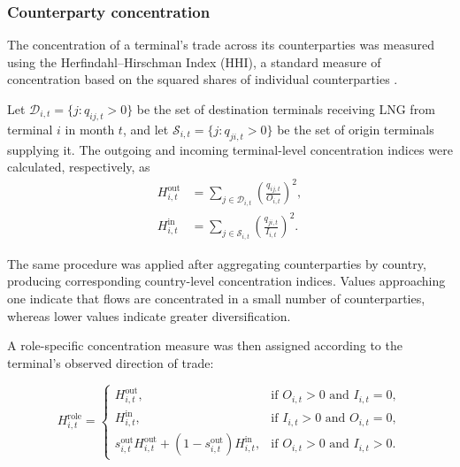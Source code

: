 \documentclass[pdftex,12pt,openright,a4paper,oneside]{book}
\begin{document}
\subsubsection{Counterparty concentration}
\label{hhi_index}
The concentration of a terminal's trade across its counterparties was measured using the Herfindahl--Hirschman Index (HHI), a standard measure of concentration based on the squared shares of individual counterparties \citep{hirschman1945}. 

Let \(\mathcal{D}_{i,t}=\{j:q_{ij,t}>0\}\) be the set of
destination terminals receiving LNG from terminal \(i\) in month \(t\),
and let \(\mathcal{S}_{i,t}=\{j:q_{ji,t}>0\}\) be the set of
origin terminals supplying it. 
The outgoing and incoming terminal-level concentration indices were calculated, respectively, as
\begin{equation}
\begin{aligned}
H^{\mathrm{out}}_{i,t}
&=
\sum_{j\in\mathcal{D}_{i,t}}
\left(\frac{q_{ij,t}}{O_{i,t}}\right)^2,\\
H^{\mathrm{in}}_{i,t}
&=
\sum_{j\in\mathcal{S}_{i,t}}
\left(\frac{q_{ji,t}}{I_{i,t}}\right)^2.
\end{aligned}
\label{eq:terminal_hhi}
\end{equation}

The same procedure was applied after aggregating counterparties by country, producing corresponding country-level concentration indices. 
Values approaching one indicate that flows are concentrated in a small number of counterparties, whereas lower values indicate greater diversification.

A role-specific concentration measure was then assigned according to the terminal's observed direction of trade:

\begin{equation}
H^{\mathrm{role}}_{i,t}
=
\begin{cases}
H^{\mathrm{out}}_{i,t},
& \text{if } O_{i,t}>0 \text{ and } I_{i,t}=0, \\[4pt]
H^{\mathrm{in}}_{i,t},
& \text{if } I_{i,t}>0 \text{ and } O_{i,t}=0, \\[4pt]
s^{\mathrm{out}}_{i,t}H^{\mathrm{out}}_{i,t}
+
\left(1-s^{\mathrm{out}}_{i,t}\right)H^{\mathrm{in}}_{i,t},
& \text{if } O_{i,t}>0 \text{ and } I_{i,t}>0.
\end{cases}
\label{eq:role_hhi}
\end{equation}
\end{document}
